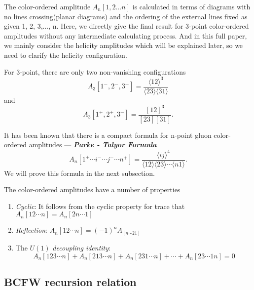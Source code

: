 \documentclass[12pt]{article}
\numberwithin{equation}{section}
\newcommand{\mdavg}[2]{\langle #1 \rangle\!\langle #2 \rangle}
\newcommand{\avg}[1]{\langle #1 \rangle}
\begin{document}
The color-ordered amplitude $A_n[1,2 ... n]$ is calculated in terms of diagrams with no lines crossing(planar diagrams) and the ordering of the external lines fixed as given 1, 2, 3,..., n. Here, we directly give the final result for 3-point color-ordered amplitudes without any intermediate calculating process. And in this full paper, we mainly consider the helicity amplitudes which will be explained later, so we need to clarify the helicity configuration.

For 3-point, there are only two non-vanishing configurations
\begin{equation}
    A_3[1^-,2^-,3^+]=\frac{\avg{12}^3}{\mdavg{23}{31}}
\end{equation}
and 
\begin{equation}
    A_3[1^+,2^+,3^-]=\frac{[12]^3}{[23][31]}.
\end{equation}

It has been known that there is a compact formula for n-point gluon color-ordered amplitudes --- \textbf{\textit{Parke - Talyor Formula}}
\begin{equation}
    A_n[1^+\cdots i^-\cdots j^- \cdots n^+]=\frac{\avg{ij}^4}{\mdavg{12}{23}\cdots\avg{n1}}.
\end{equation}
We will prove this formula in the next subsection.

The color-ordered amplitudes have a number of properties
\begin{enumerate}
    \item \textit{Cyclic}: It follows from the cyclic property for trace that $A_n[12\cdots n]=A_n[2n\cdots 1]$
    \item \textit{Reflection}: $A_n[12\cdots n]=(-1)^nA_[n\cdots 21]$
    \item The $U(1)$ \textit{decoupling identity}: 
    \begin{equation}
        A_n[123\cdots n]+A_n[213\cdots n]+A_n[231\cdots n]+\cdots + A_n[23\cdots 1n]=0
    \end{equation}
\end{enumerate}
\subsection{BCFW recursion relation}









\end{document}
